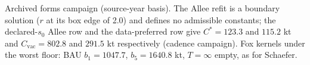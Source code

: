 \begin{table}[H]
\centering
\caption{Cod: alternative surplus forms on the frozen window.}
\label{tab:si-forms}
\small
{}
\par\smallskip\begin{minipage}{0.97\linewidth}\footnotesize Archived forms campaign (source-year basis). The Allee refit is a boundary solution ($r$ at its box edge of 2.0) and defines no admissible constants; the declared-$s_0$ Allee row and the data-preferred row give $C^*=123.3$ and $115.2$ kt and $C_{\mathrm{vac}}=802.8$ and $291.5$ kt respectively (cadence campaign). Fox kernels under the worst floor: BAU $b_1=1047.7$, $b_5=1640.8$ kt, $T=\infty$ empty, as for Schaefer.\end{minipage}
\end{table}
